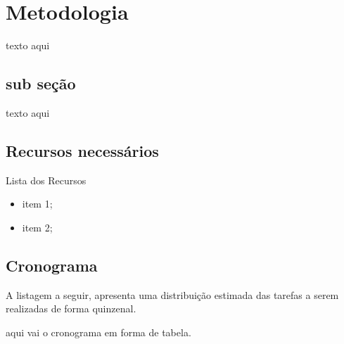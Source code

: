 \section{Metodologia}

texto aqui 

\subsection{sub seção }

texto aqui 


\subsection{Recursos necessários}

Lista dos Recursos 

\begin{itemize}
\item item 1;
\item item 2;
\end{itemize}

\subsection{Cronograma}

A listagem a seguir, apresenta uma distribuição estimada das tarefas a serem
realizadas de forma quinzenal.

aqui vai o cronograma em forma de tabela.
